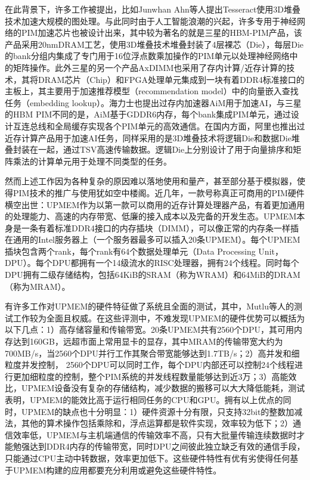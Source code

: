 在此背景下，许多工作被提出，比如Junwhan Ahn等人\cite{Tesseract}提出Tesseract使用3D堆叠技术加速大规模的图处理。与此同时由于人工智能浪潮的兴起，许多专用于神经网络的PIM加速芯片也被设计出来，其中较为著名的就是三星的HBM-PIM产品\cite{SamsungHBMPIM}，该产品采用20nmDRAM工艺，使用3D堆叠技术堆叠封装了4层裸芯（Die），每层Die的bank分组内集成了专门用于16位浮点数乘加操作的PIM单元以处理神经网络中的矩阵操作。此外三星的另一个产品AxDIMM\cite{AxDIMM}也采用了存内计算/近存计算的技术，其将DRAM芯片（Chip）和FPGA处理单元集成到一块有着DDR4标准接口的主板上，其主要用于加速推荐模型（recommendation model）中的向量嵌入查找任务（embedding lookup）。海力士也提出过存内加速器AiM\cite{AiM}用于加速AI，与三星的HBM PIM不同的是，AiM基于GDDR6内存，每个bank集成PIM单元，通过设计互连总线和全局缓存实现各个PIM单元的高效通信。在国内方面，阿里也推出过近存计算产品\cite{AlibabaPIM}用于加速AI任务，同样采用的是3D堆叠技术将逻辑Die和数据Die堆叠封装在一起，通过TSV高速传输数据。逻辑Die上分别设计了用于向量排序和矩阵乘法的计算单元用于处理不同类型的任务。

然而上述工作因为各种复杂的原因难以落地使用和量产，甚至部分基于模拟器，使得PIM技术的推广与使用犹如空中楼阁。近几年，一款号称真正可商用的PIM硬件横空出世：UPMEM作为以第一款可以商用的近存计算处理器产品\cite{UPMEMHotChips}，有着更加通用的处理能力、高速的内存带宽、低廉的接入成本以及完备的开发生态。UPMEM本身是一条有着标准DDR4接口的内存插块（DIMM），可以像正常的内存条一样插在通用的Intel服务器上（一个服务器最多可以插入20条UPMEM）。每个UPMEM插块包含两个rank，每个rank有64个数据处理单元（Data Processing Unit，DPU）。每个DPU都拥有一个14级流水的RISC处理器，拥有24个线程。同时每个DPU拥有二级存储结构，包括64KiB的SRAM（称为WRAM）和64MiB的DRAM（称为MRAM）。

有许多工作对UPMEM的硬件特征做了系统且全面的测试\cite{BenchmarkingMutlu,BenchmarkingUPMEM,BenchmarkingUBC,BenchmarkingGermany}，其中，Mutlu等人\cite{BenchmarkingMutlu}的测试工作较为全面且权威。在这些评测中，不难发现UPMEM的硬件优势可以概括为以下几点：1）高存储容量和传输带宽。20条UPMEM共有2560个DPU，其可用内存达到160GB，远超市面上常用显卡的显存，其中MRAM的传输带宽大约为700MB/s，当2560个DPU并行工作其聚合带宽能够达到1.7TB/s；2）高并发和细粒度并发控制， 2560个DPU可以同时工作，每个DPU内部还可以控制24个线程进行更加细粒度的控制，整个PIM系统的并发线程数量能够达到近3万；3）高能效比，UPMEM设备没有复杂的存储结构，减少数据的搬移可以大大降低能耗，测试表明，UPMEM的能效比高于运行相同任务的CPU和GPU\cite{BenchmarkingMutlu}。拥有以上优点的同时，UPMEM的缺点也十分明显：1）硬件资源十分有限，只支持32bit的整数加减法，其他的算术操作包括乘除和，浮点运算都是软件实现，效率较为低下；2）通信效率低，UPMEM与主机端通信的传输效率不高，只有大批量传输连续数据时才能勉强达到DDR4内存的传输带宽，同时DPU之间彼此独立缺乏有效的通信手段，只能通过CPU主动中转数据，效率更加低下。这些硬件特性有优有劣使得任何基于UPMEM构建的应用都要充分利用或避免这些硬件特性。


